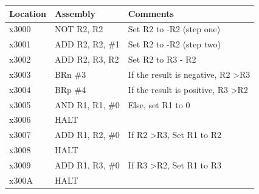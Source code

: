 \documentclass{article}
\begin{document}
\begin{table}[!h]
\begin{tabular}{|l|l|l|}
\hline
\textbf{Location} & \textbf{Assembly} & \textbf{Comments}                             \\ \hline
x3000             & NOT R2, R2        & Set R2 to -R2 (step one)                      \\ \hline
x3001             & ADD R2, R2, \#1   & Set R2 to -R2 (step two)                      \\ \hline
x3002             & ADD R2, R3, R2    & Set R2 to R3 - R2                             \\ \hline
x3003             & BRn \#3           & If the result is negative, R2 \textgreater R3 \\ \hline
x3004             & BRp \#4           & If the result is positive, R3 \textgreater R2    \\ \hline
x3005             & AND R1, R1, \#0   & Else, set R1 to 0                             \\ \hline
x3006             & HALT              &                                               \\ \hline
x3007             & ADD R1, R2, \#0   & If R2 \textgreater R3, Set R1 to R2           \\ \hline
x3008             & HALT              &                                               \\ \hline
x3009             & ADD R1, R3, \#0   & If R3 \textgreater R2, Set R1 to R3           \\ \hline
x300A             & HALT              &                                               \\ \hline
\end{tabular}
\end{table}

\newpage
\end{document}
